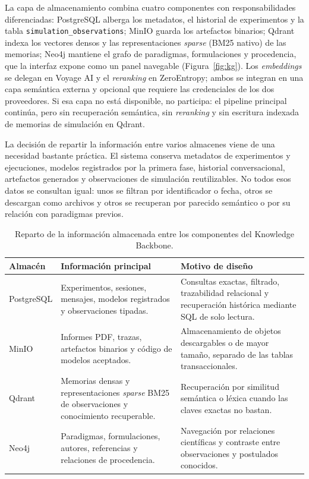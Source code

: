 La capa de almacenamiento combina cuatro componentes con
responsabilidades diferenciadas: PostgreSQL alberga los metadatos, el
historial de experimentos y la tabla
\texttt{simulation\_observations}; MinIO guarda los artefactos binarios;
Qdrant indexa los vectores densos y las representaciones \textit{sparse}
(BM25 nativo) de las memorias; Neo4j mantiene el grafo de paradigmas,
formulaciones y procedencia, que la interfaz expone como un panel navegable
(Figura~\ref{fig:kg}). Los \textit{embeddings} se delegan en Voyage AI y el
\textit{reranking} en ZeroEntropy; ambos se integran en una capa semántica
externa y opcional que requiere las credenciales de los dos proveedores. Si
esa capa no está disponible, no participa: el pipeline principal continúa, pero
sin recuperación semántica, sin \textit{reranking} y sin escritura indexada de
memorias de simulación en Qdrant.

La decisión de repartir la información entre varios almacenes viene de una
necesidad bastante práctica. El sistema conserva metadatos de experimentos y
ejecuciones, modelos registrados por la primera fase, historial conversacional,
artefactos generados y observaciones de simulación reutilizables. No todos esos
datos se consultan igual: unos se filtran por identificador o fecha, otros se
descargan como archivos y otros se recuperan por parecido semántico o por su
relación con paradigmas previos.

\begin{table}[H]
\begin{center}
\small
\setlength{\tabcolsep}{4pt}
\renewcommand{\arraystretch}{1.18}
\begin{tabular}{|>{\raggedright\arraybackslash}p{3.0cm}|>{\raggedright\arraybackslash}p{4.2cm}|>{\raggedright\arraybackslash}p{4.6cm}|} \hline
\textbf{Almacén} & \textbf{Información principal} & \textbf{Motivo de diseño} \\ \hline
PostgreSQL & Experimentos, sesiones, mensajes, modelos registrados y observaciones tipadas. & Consultas exactas, filtrado, trazabilidad relacional y recuperación histórica mediante SQL de solo lectura. \\ \hline
MinIO & Informes PDF, trazas, artefactos binarios y código de modelos aceptados. & Almacenamiento de objetos descargables o de mayor tamaño, separado de las tablas transaccionales. \\ \hline
Qdrant & Memorias densas y representaciones \textit{sparse} BM25 de observaciones y conocimiento recuperable. & Recuperación por similitud semántica o léxica cuando las claves exactas no bastan. \\ \hline
Neo4j & Paradigmas, formulaciones, autores, referencias y relaciones de procedencia. & Navegación por relaciones científicas y contraste entre observaciones y postulados conocidos. \\ \hline
\end{tabular}
\caption[Información almacenada en el Knowledge Backbone]{Reparto de la
información almacenada entre los componentes del Knowledge Backbone.}
\label{tab:almacenamiento-knowledge-backbone}
\end{center}
\end{table}

